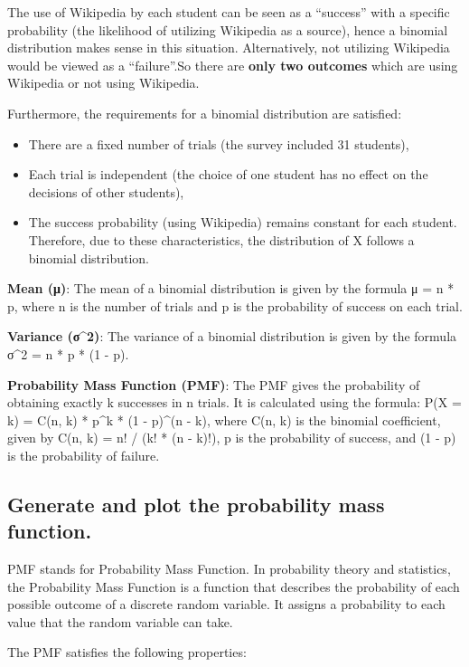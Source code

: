 \documentclass[
]{article}
\begin{document}
The use of Wikipedia by each student can be seen as a ``success'' with a
specific probability (the likelihood of utilizing Wikipedia as a
source), hence a binomial distribution makes sense in this situation.
Alternatively, not utilizing Wikipedia would be viewed as a
``failure''.So there are \textbf{only two outcomes} which are using
Wikipedia or not using Wikipedia.

Furthermore, the requirements for a binomial distribution are satisfied:

\begin{itemize}
\item
  There are a fixed number of trials (the survey included 31 students),
\item
  Each trial is independent (the choice of one student has no effect on
  the decisions of other students),
\item
  The success probability (using Wikipedia) remains constant for each
  student. Therefore, due to these characteristics, the distribution of
  X follows a binomial distribution.
\end{itemize}

\textbf{Mean (μ)}: The mean of a binomial distribution is given by the
formula μ = n * p, where n is the number of trials and p is the
probability of success on each trial.

\textbf{Variance (σ\^{}2)}: The variance of a binomial distribution is
given by the formula σ\^{}2 = n * p * (1 - p).

\textbf{Probability Mass Function (PMF)}: The PMF gives the probability
of obtaining exactly k successes in n trials. It is calculated using the
formula: P(X = k) = C(n, k) * p\^{}k * (1 - p)\^{}(n - k), where C(n, k)
is the binomial coefficient, given by C(n, k) = n! / (k! * (n - k)!), p
is the probability of success, and (1 - p) is the probability of
failure.

\subsection{Generate and plot the probability mass
function.}\label{generate-and-plot-the-probability-mass-function.}

PMF stands for Probability Mass Function. In probability theory and
statistics, the Probability Mass Function is a function that describes
the probability of each possible outcome of a discrete random variable.
It assigns a probability to each value that the random variable can
take.

The PMF satisfies the following properties:
\end{document}
